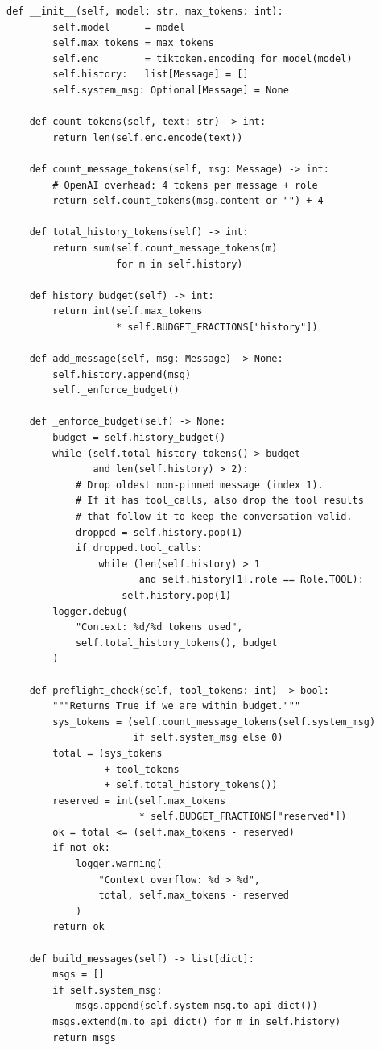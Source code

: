 \begin{lstlisting}[style=pythonstyle, caption={Production Agent Harness -- Core Implementation}]
    def __init__(self, model: str, max_tokens: int):
        self.model      = model
        self.max_tokens = max_tokens
        self.enc        = tiktoken.encoding_for_model(model)
        self.history:   list[Message] = []
        self.system_msg: Optional[Message] = None

    def count_tokens(self, text: str) -> int:
        return len(self.enc.encode(text))

    def count_message_tokens(self, msg: Message) -> int:
        # OpenAI overhead: 4 tokens per message + role
        return self.count_tokens(msg.content or "") + 4

    def total_history_tokens(self) -> int:
        return sum(self.count_message_tokens(m)
                   for m in self.history)

    def history_budget(self) -> int:
        return int(self.max_tokens
                   * self.BUDGET_FRACTIONS["history"])

    def add_message(self, msg: Message) -> None:
        self.history.append(msg)
        self._enforce_budget()

    def _enforce_budget(self) -> None:
        budget = self.history_budget()
        while (self.total_history_tokens() > budget
               and len(self.history) > 2):
            # Drop oldest non-pinned message (index 1).
            # If it has tool_calls, also drop the tool results
            # that follow it to keep the conversation valid.
            dropped = self.history.pop(1)
            if dropped.tool_calls:
                while (len(self.history) > 1
                       and self.history[1].role == Role.TOOL):
                    self.history.pop(1)
        logger.debug(
            "Context: %d/%d tokens used",
            self.total_history_tokens(), budget
        )

    def preflight_check(self, tool_tokens: int) -> bool:
        """Returns True if we are within budget."""
        sys_tokens = (self.count_message_tokens(self.system_msg)
                      if self.system_msg else 0)
        total = (sys_tokens
                 + tool_tokens
                 + self.total_history_tokens())
        reserved = int(self.max_tokens
                       * self.BUDGET_FRACTIONS["reserved"])
        ok = total <= (self.max_tokens - reserved)
        if not ok:
            logger.warning(
                "Context overflow: %d > %d",
                total, self.max_tokens - reserved
            )
        return ok

    def build_messages(self) -> list[dict]:
        msgs = []
        if self.system_msg:
            msgs.append(self.system_msg.to_api_dict())
        msgs.extend(m.to_api_dict() for m in self.history)
        return msgs


\end{lstlisting}
